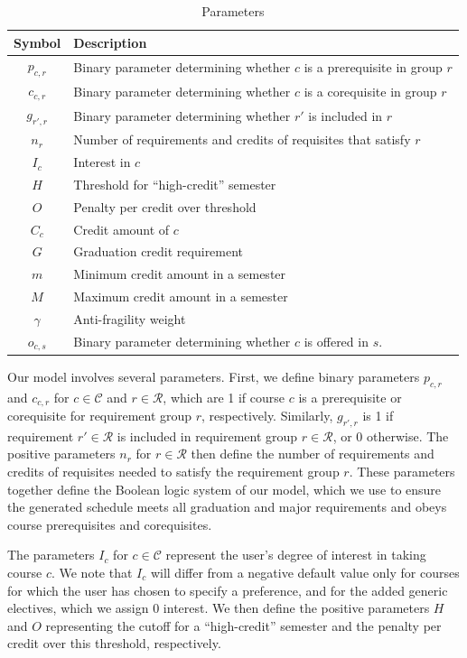 \documentclass[12pt]{article}
\renewcommand{\R}{\mathcal{R}}
\renewcommand{\C}{\mathcal{C}}
\begin{document}
\begin{table}[H]
    \centering
    \begin{tabular}{c|l}
        \hline 
        \textbf{Symbol} & \textbf{Description} \\
        \hline 
         $p_{c,r}$&  Binary parameter determining whether $c$ is a prerequisite in group $r$\\ 
         $c_{c,r}$ & Binary parameter determining whether $c$ is a corequisite in group $r$\\
          $g_{r',r}$& Binary parameter determining whether $r'$ is included in $r$ \\ 
          $n_r$&  Number of requirements and credits of requisites that satisfy $r$\\ 
         $I_c$ & Interest in $c$\\ 
          $H$& Threshold for ``high-credit'' semester\\
          $O$ & Penalty per credit over threshold\\ 
          $C_c$& Credit amount of $c$\\
          $G$ & Graduation credit requirement\\ 
          $m$ & Minimum credit amount in a semester\\ 
          $M$ & Maximum credit amount in a semester\\ 
          $\gamma$ & Anti-fragility weight\\
          $o_{c,s}$ & Binary parameter determining whether $c$ is offered in $s$.
    \end{tabular}

    \caption{Parameters}
    \label{tab:parameters}
\end{table}

Our model involves several parameters.
First, we define binary parameters $p_{c,r}$ and $c_{c,r}$ for $c\in\C$ and $r\in\R$, which are 1 if course $c$ is a prerequisite or corequisite for requirement group $r$, respectively.
Similarly, $g_{r',r}$ is 1 if requirement $r'\in\R$ is included in requirement group $r\in\R$, or 0 otherwise.
The positive parameters $n_r$ for $r\in\R$ then define the number of requirements and credits of requisites needed to satisfy the requirement group $r$.
These parameters together define the Boolean logic system of our model, which we use to ensure the generated schedule meets all graduation and major requirements and obeys course prerequisites and corequisites.

The parameters $I_c$ for $c\in\C$ represent the user's degree of interest in taking course $c$.
We note that $I_c$ will differ from a negative default value only for courses for which the user has chosen to specify a preference, and for the added generic electives, which we assign 0 interest.
We then define the positive parameters $H$ and $O$ representing the cutoff for a ``high-credit'' semester and the penalty per credit over this threshold, respectively.
\end{document}
